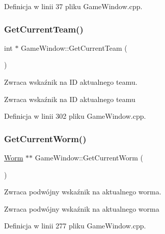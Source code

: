 Definicja w linii 37 pliku Game\+Window.\+cpp.

\mbox{\label{class_game_window_a67485df550fda5b1cc0aa6e7644f72e8}} 
\subsubsection{\texorpdfstring{Get\+Current\+Team()}{GetCurrentTeam()}}
{\footnotesize\ttfamily int $\ast$ Game\+Window\+::\+Get\+Current\+Team (\begin{DoxyParamCaption}{ }\end{DoxyParamCaption})}



Zwraca wskaźnik na ID aktualnego team\textquotesingle{}u. 

\begin{DoxyReturn}{Zwraca}
wskaźnik na ID aktualnego team\textquotesingle{}u 
\end{DoxyReturn}


Definicja w linii 302 pliku Game\+Window.\+cpp.

\mbox{\label{class_game_window_a172c7184152f5c49a5089205ae3528f5}} 
\subsubsection{\texorpdfstring{Get\+Current\+Worm()}{GetCurrentWorm()}}
{\footnotesize\ttfamily \mbox{\hyperlink{class_worm}{Worm}} $\ast$$\ast$ Game\+Window\+::\+Get\+Current\+Worm (\begin{DoxyParamCaption}{ }\end{DoxyParamCaption})}



Zwraca podwójny wskaźnik na aktualnego worma. 

\begin{DoxyReturn}{Zwraca}
podwójny wskaźnik na aktualnego worma 
\end{DoxyReturn}


Definicja w linii 277 pliku Game\+Window.\+cpp.

\mbox{\label{class_game_window_a6dbc377a22fff8ab01f30b10337dc5ae}} 
